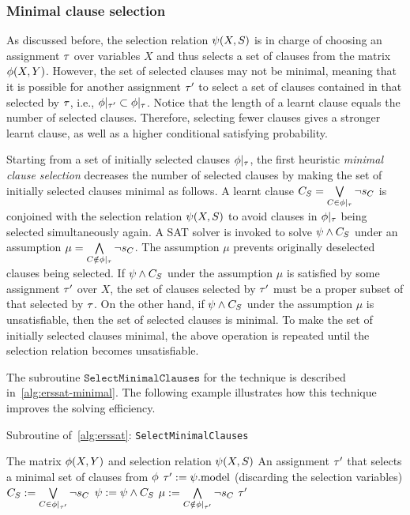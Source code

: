 \subsubsection{Minimal clause selection}
As discussed before,
the selection relation $\psi(X,S)$ is in charge of choosing an assignment $\tau$ over variables $X$ and thus selects a set of clauses from the matrix $\phi(X,Y)$.
However, the set of selected clauses may not be minimal,
meaning that it is possible for another assignment $\tau'$ to select a set of clauses contained in that selected by $\tau$, i.e., $\phi|_{\tau'}\subset\phi|_{\tau}$.
Notice that the length of a learnt clause equals the number of selected clauses.
Therefore, selecting fewer clauses gives a stronger learnt clause,
as well as a higher conditional satisfying probability.

Starting from a set of initially selected clauses $\phi|_{\tau}$,
the first heuristic \textit{minimal clause selection} decreases the number of selected clauses by making the set of initially selected clauses minimal as follows.
A learnt clause $C_S=\bigvee\limits_{C\in\phi|_{\tau}}\lnot s_{C}$ is conjoined with the selection relation $\psi(X,S)$ to avoid clauses in $\phi|_{\tau}$ being selected simultaneously again.
A SAT solver is invoked to solve $\psi\land C_S$ under an assumption $\mu=\bigwedge\limits_{C\notin\phi|_{\tau}}\lnot s_{C}$.
The assumption $\mu$ prevents originally deselected clauses being selected.
If $\psi\land C_S$ under the assumption $\mu$ is satisfied by some assignment $\tau'$ over $X$,
the set of clauses selected by $\tau'$ must be a proper subset of that selected by $\tau$.
On the other hand, if $\psi\land C_S$ under the assumption $\mu$ is unsatisfiable,
then the set of selected clauses is minimal.
To make the set of initially selected clauses minimal,
the above operation is repeated until the selection relation becomes unsatisfiable.

The subroutine $\texttt{SelectMinimalClauses}$ for the technique is described in~\cref{alg:erssat-minimal}.
The following example illustrates how this technique improves the solving efficiency.

\begin{algorithm}[ht]
    \caption{Subroutine of~\cref{alg:erssat}: \texttt{SelectMinimalClauses}}
    \label{alg:erssat-minimal}
    \begin{algorithmic}[1]
        \REQUIRE The matrix $\phi(X,Y)$ and selection relation $\psi(X,S)$
        \ENSURE An assignment $\tau'$ that selects a minimal set of clauses from $\phi$
        \REPEAT
        \STATE $\tau' := \psi.\mathrm{model}$ (discarding the selection variables)
        \STATE $C_S := \bigvee\limits_{C\in\phi|_{\tau'}}\lnot s_{C}$
        \STATE $\psi := \psi \land C_S$
        \STATE $\mu := \bigwedge\limits_{C\notin\phi|_{\tau'}}\lnot s_{C}$
        \UNTIL{($\unsat{\pcf{\select}{\mu}}$)}
        \RETURN $\tau'$
    \end{algorithmic}
\end{algorithm}

